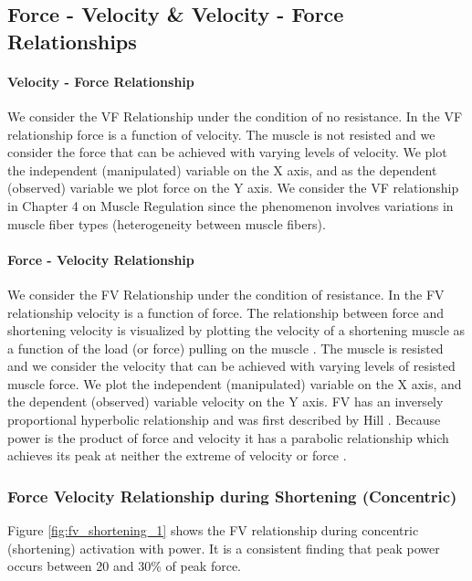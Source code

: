 \subsection{Force - Velocity \& Velocity - Force Relationships}

\paragraph{Velocity - Force Relationship}
We consider the VF Relationship under the condition of no resistance. In the VF relationship force is a function of velocity. The muscle is not resisted \footnotemark{} and we consider the force that can be achieved with varying levels of velocity. We plot the independent (manipulated) variable on the X axis, and as the dependent (observed) variable we plot force on the Y axis. We consider the VF relationship in Chapter 4 on Muscle Regulation since the phenomenon involves variations in muscle fiber types (heterogeneity between muscle fibers).

\paragraph{Force - Velocity Relationship}
We consider the FV Relationship under the condition of resistance. In the FV relationship velocity is a function of force. The relationship between force and shortening velocity is visualized by plotting the velocity of a shortening muscle as a function of the load (or force) pulling on the muscle \cite{seow_molecular_2022}. The muscle is resisted and we consider the velocity that can be achieved with varying levels of resisted muscle force. We plot the independent (manipulated) variable on the X axis, and the dependent (observed) variable velocity on the Y axis. FV has an inversely proportional hyperbolic relationship and was first described by Hill \cite{seow_hills_2013}. Because power is the product of force and velocity it has a parabolic relationship which achieves its peak at neither the extreme of velocity or force \cite{seow_hills_2013}. 

\subsubsection{Force Velocity Relationship during Shortening (Concentric)}
Figure \ref{fig:fv_shortening_1} shows the FV relationship during concentric (shortening) activation with power. It is a consistent finding that peak power occurs between 20 and 30\% of peak force.

